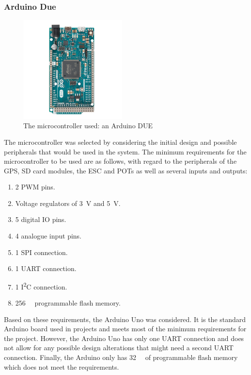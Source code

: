 		\subsubsection{Arduino Due}\par
		\begin{figure}[!ht]
			\begin{center}
				\includegraphics[width = 0.48\textwidth]{figures/DUE.jpg}
				\caption{The microcontroller used: an Arduino DUE}
				\label{fig:3:due}
			\end{center}
		\end{figure}
		The microcontroller was selected by considering the initial design and possible peripherals that would be used in the system. The minimum requirements for the microcontroller to be used are as follows, with regard to the peripherals of the GPS, SD card modules, the ESC and POTs as well as several inputs and outputs:
		\begin{enumerate}
			\item 2 PWM pins.
			\item Voltage regulators of \SI{3}{\volt} and \SI{5}{\volt}.
			\item 5 digital IO pins.
			\item 4 analogue input pins.
			\item 1 SPI connection.
			\item 1 UART connection.
			\item 1 I\textsuperscript{2}C connection.
			\item \SI{256}{\kilo\byte} programmable flash memory.		
		\end{enumerate}
		Based on these requirements, the Arduino Uno was considered. It is the standard Arduino board used in projects and meets most of the minimum requirements for the project.  However, the Arduino Uno has only one UART connection and does not allow for any possible design alterations that might need a second UART connection. Finally, the Arduino only has \SI{32}{\kilo\byte} of programmable flash memory which does not meet the requirements.\par 

